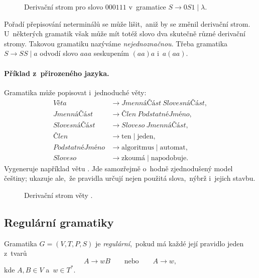 \begin{figure}[h]
    \centering
    
    \caption{Derivační strom pro slovo $000111$ v~gramatice $S\to0S1\mid\lambda$.}
    \label{fig:derivacni-strom}
\end{figure}

Pořadí přepisování neterminálů se může lišit,~aniž by se změnil derivační strom. U~některých gramatik však může mít totéž slovo dva skutečně různé derivační stromy. Takovou gramatiku nazýváme \emph{nejednoznačnou}. Třeba gramatika $S\to SS\mid a$ odvodí slovo $aaa$ seskupením $(aa)a$ i~$a(aa)$.

\paragraph{Příklad z~přirozeného jazyka.}

Gramatika může popisovat i~jednoduché věty:
\[
\begin{aligned}
    \textit{Věta}&\to\textit{JmennáČást}\ \textit{SlovesnáČást},\\
    \textit{JmennáČást}&\to\textit{Člen}\ \textit{PodstatnéJméno},\\
    \textit{SlovesnáČást}&\to\textit{Sloveso}\ \textit{JmennáČást},\\
    \textit{Člen}&\to\text{ten}\mid\text{jeden},\\
    \textit{PodstatnéJméno}&\to\text{algoritmus}\mid\text{automat},\\
    \textit{Sloveso}&\to\text{zkoumá}\mid\text{napodobuje}.
\end{aligned}
\]
Vygeneruje například větu . Jde samozřejmě o~hodně zjednodušený model češtiny; ukazuje ale,~že pravidla určují nejen použitá slova,~nýbrž i~jejich stavbu.

\begin{figure}[h]
    \centering
    
    \caption{Derivační strom věty .}
    \label{fig:prirozeny-jazyk}
\end{figure}

\subsection{Regulární gramatiky}

\begin{definition}
    Gramatika $G=(V,T,P,S)$ je \emph{regulární},~pokud má každé její pravidlo jeden z~tvarů
    \[
        A\to wB
        \qquad\text{nebo}\qquad
        A\to w,
    \]
    kde $A,B\in V$ a~$w\in T^*$.
\end{definition}

